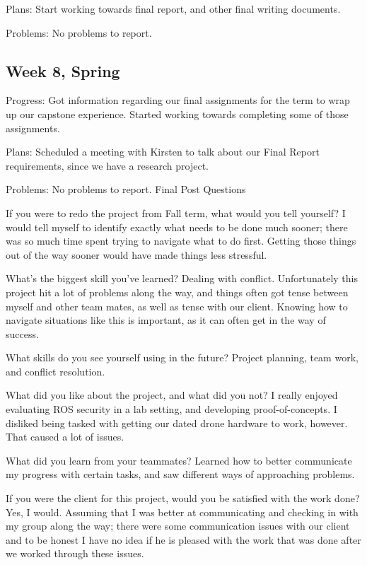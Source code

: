 \documentclass[IEEEtran,letterpaper,10pt,notitlepage,draftclsnofoot,onecolumn]{article}
\begin{document}
                            Plans: Start working towards final report, and other final writing documents.

                            Problems: No problems to report.
                            \subsection{Week 8, Spring}
                            Progress: Got information regarding our final assignments for the term to wrap up our capstone experience. Started working towards completing some of those assignments.

                            Plans: Scheduled a meeting with Kirsten to talk about our Final Report requirements, since we have a research project.

                            Problems: No problems to report.
                            Final Post Questions

                                If you were to redo the project from Fall term, what would you tell yourself? I would tell myself to identify exactly what needs to be done much sooner; there was so much time spent trying to navigate what to do first. Getting those things out of the way sooner would have made things less stressful.

                                    What's the biggest skill you've learned? Dealing with conflict. Unfortunately this project hit a lot of problems along the way, and things often got tense between myself and other team mates, as well as tense with our client. Knowing how to navigate situations like this is important, as it can often get in the way of success.

                                        What skills do you see yourself using in the future? Project planning, team work, and conflict resolution.

                                            What did you like about the project, and what did you not? I really enjoyed evaluating ROS security in a lab setting, and developing proof-of-concepts. I disliked being tasked with getting our dated drone hardware to work, however. That caused a lot of issues.

                                                What did you learn from your teammates? Learned how to better communicate my progress with certain tasks, and saw different ways of approaching problems.

                                                    If you were the client for this project, would you be satisfied with the work done? Yes, I would. Assuming that I was better at communicating and checking in with my group along the way; there were some communication issues with our client and to be honest I have no idea if he is pleased with the work that was done after we worked through these issues.
\end{document}
